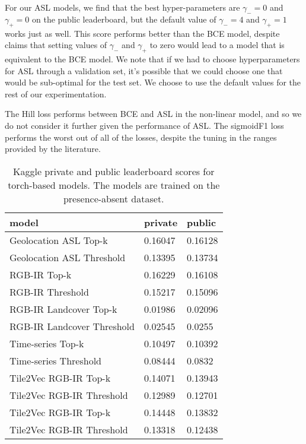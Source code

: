 For our ASL models, we find that the best hyper-parameters are $\gamma_{-}=0$ and $\gamma_{+}=0$ on the public leaderboard, but the default value of $\gamma_{-}=4$ and $\gamma_{+}=1$ works just as well.
This score performs better than the BCE model, despite claims that setting values of $\gamma_{-}$ and $\gamma_{+}$ to zero would lead to a model that is equivalent to the BCE model.
We note that if we had to choose hyperparameters for ASL through a validation set, it's possible that we could choose one that would be sub-optimal for the test set.
We choose to use the default values for the rest of our experimentation.

The Hill loss performs between BCE and ASL in the non-linear model, and so we do not consider it further given the performance of ASL.
The sigmoidF1 loss performs the worst out of all of the losses, despite the tuning in the ranges provided by the literature.

\begin{table}[h]
    \caption{
        Kaggle private and public leaderboard scores for torch-based models.
        The models are trained on the presence-absent dataset.
    }
    \label{tab:cnn}
    \centering
    \begin{tabular}{|l|l|l|}
    \hline
    \textbf{model}     & \textbf{private} & \textbf{public} \\ \hline
    Geolocation ASL Top-k       & 0.16047          & 0.16128         \\ \hline
    Geolocation ASL Threshold     & 0.13395          & 0.13734         \\ \hline
    RGB-IR Top-k     & 0.16229          & 0.16108         \\ \hline
    RGB-IR Threshold   & 0.15217          & 0.15096         \\ \hline
    RGB-IR Landcover Top-k   & 0.01986          & 0.02096         \\ \hline
    RGB-IR Landcover Threshold & 0.02545          & 0.0255          \\ \hline
    Time-series Top-k            & 0.10497          & 0.10392         \\ \hline
    Time-series Threshold          & 0.08444          & 0.0832          \\ \hline
    Tile2Vec RGB-IR Top-k      & 0.14071          & 0.13943         \\ \hline
    Tile2Vec RGB-IR Threshold    & 0.12989          & 0.12701         \\ \hline
    Tile2Vec RGB-IR Top-k      & 0.14448          & 0.13832         \\ \hline
    Tile2Vec RGB-IR Threshold    & 0.13318          & 0.12438         \\ \hline
    \end{tabular}%
    \end{table}

